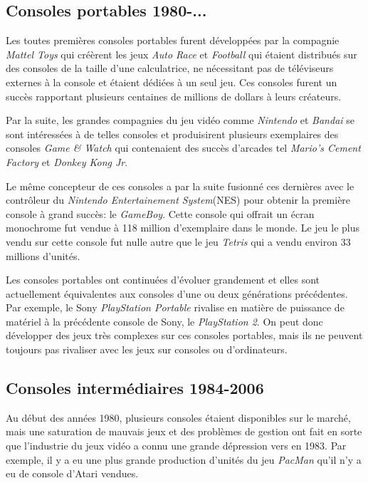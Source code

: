 \documentclass[12pt,oneside,letterpaper,francais]{book}
\begin{document}
\subsection{Consoles portables 1980-...}
Les toutes premières consoles portables furent développées par la
compagnie \textit{Mattel Toys} qui créèrent les jeux \textit{Auto
  Race} et \textit{Football} qui étaient distribués sur des consoles
de la taille d'une calculatrice, ne nécessitant pas de téléviseurs
externes à la console et étaient dédiées à un seul jeu. Ces consoles
furent un succès rapportant plusieurs centaines de millions de dollars
à leurs créateurs.

Par la suite, les grandes compagnies du jeu vidéo comme
\textit{Nintendo} et \textit{Bandai} se sont intéressées à de telles
consoles et produisirent plusieurs exemplaires des consoles
\textit{Game \& Watch} qui contenaient des succès d'arcades tel
\textit{Mario's Cement Factory} et \textit{Donkey Kong Jr}.

Le même concepteur de ces consoles a par la suite fusionné ces
dernières avec le contrôleur du \textit{Nintendo Entertainement
  System}(NES) pour obtenir la première console à grand succès: le
\textit{GameBoy}. Cette console qui offrait un écran monochrome fut
vendue à 118 million d'exemplaire dans le monde. Le jeu le plus vendu
sur cette console fut nulle autre que le jeu \textit{Tetris} qui a
vendu environ 33 millions d'unités.

Les consoles portables ont continuées d'évoluer grandement et elles
sont actuellement équivalentes aux consoles d'une ou deux générations
précédentes. Par exemple, le Sony \textit{PlayStation Portable}
rivalise en matière de puissance de matériel à la précédente console
de Sony, le \textit{PlayStation 2}. On peut donc développer des jeux
très complexes sur ces consoles portables, mais ils ne peuvent toujours
pas rivaliser avec les jeux sur consoles ou d'ordinateurs.

\subsection{Consoles intermédiaires 1984-2006}
Au début des années 1980, plusieurs consoles étaient disponibles sur
le marché, mais une saturation de mauvais jeux et des problèmes de
gestion ont fait en sorte que l'industrie du jeux vidéo a connu une
grande dépression vers en 1983. Par exemple, il y a eu une plus grande
production d'unités du jeu \textit{PacMan} qu'il n'y a eu de console
d'Atari vendues.
\end{document}
